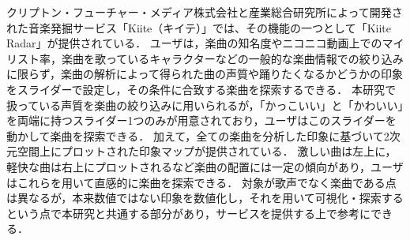 クリプトン・フューチャー・メディア株式会社と産業総合研究所によって開発された音楽発掘サービス「Kiite（キイテ）」では、その機能の一つとして「Kiite Radar」が提供されている\cite{kiite}．
ユーザは，楽曲の知名度やニコニコ動画上でのマイリスト率，楽曲を歌っているキャラクターなどの一般的な楽曲情報での絞り込みに限らず，楽曲の解析によって得られた曲の声質や踊りたくなるかどうかの印象をスライダーで設定し，その条件に合致する楽曲を探索するできる．
本研究で扱っている声質を楽曲の絞り込みに用いられるが，「かっこいい」と「かわいい」を両端に持つスライダー1つのみが用意されており，ユーザはこのスライダーを動かして楽曲を探索できる．
加えて，全ての楽曲を分析した印象に基づいて2次元空間上にプロットされた印象マップが提供されている．
激しい曲は左上に，軽快な曲は右上にプロットされるなど楽曲の配置には一定の傾向があり，ユーザはこれらを用いて直感的に楽曲を探索できる．
対象が歌声でなく楽曲である点は異なるが，本来数値ではない印象を数値化し，それを用いて可視化・探索するという点で本研究と共通する部分があり，サービスを提供する上で参考にできる．

